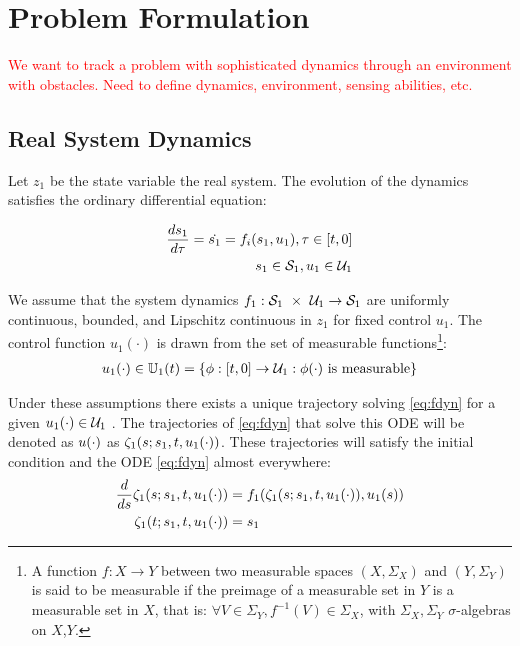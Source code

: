 \section{Problem Formulation \label{sec:formulation}}

\textcolor{red}{We want to track a problem with sophisticated dynamics through an environment with obstacles.  Need to define dynamics, environment, sensing abilities, etc.}

\subsection{Real System Dynamics}
Let $z_1$ be the state variable the real system. The evolution of the dynamics satisfies the ordinary differential equation:

\begin{equation}
\begin{aligned}
\label{eq:fdyn}
\frac{ds_1}{d\tau} = \dot{s_1} = f_i(s_1, u_1), \tau \in [t, 0] \\
s_1 \in \mathcal{S}_1, u_1 \in \mathcal{U}_1
\end{aligned}
\end{equation}

We assume that the system dynamics $f_1 : \mathcal{S}_1\ \times\ \mathcal{U}_1 \rightarrow \mathcal{S}_1$ are uniformly continuous, bounded, and Lipschitz continuous in $z_1$ for fixed control $u_1$. The control function $u_1(\cdot)$ is drawn from the set of measurable functions\footnote{A function $f:X\to Y$ between two measurable spaces $(X,\Sigma_X)$ and $(Y,\Sigma_Y)$ is said to be measurable if the preimage of a measurable set in $Y$ is a measurable set in $X$, that is: $\forall V\in\Sigma_Y, f^{-1}(V)\in\Sigma_X$, with $\Sigma_X,\Sigma_Y$ $\sigma$-algebras on $X$,$Y$.}:
\begin{equation}
\begin{aligned}
u_1(\cdot) \in \mathbb{U}_1(t) = \{\phi: [t, 0] \rightarrow \mathcal{U}_1: \phi(\cdot) \text{ is measurable}\}
\end{aligned}
\end{equation}

Under these assumptions there exists a unique trajectory solving \ref{eq:fdyn} for a given $u_1(\cdot) \in \mathcal{U}_1$ \cite{Evans84}. The trajectories of \ref{eq:fdyn} that solve this ODE will be denoted as $u(\cdot)$ as $\zeta_1(s; s_1, t, u_1(\cdot))$. These trajectories will satisfy the initial condition and the ODE \ref{eq:fdyn} almost everywhere:
\begin{equation}
\label{eq:fdyn_traj}
\begin{aligned}
\frac{d}{ds}\zeta_1(s; s_1, t, u_1(\cdot)) &= f_1(\zeta_1(s; s_1, t, u_1(\cdot)), u_1(s)) \\
\zeta_1(t; s_1, t, u_1(\cdot)) &= s_1
\end{aligned}
\end{equation}

